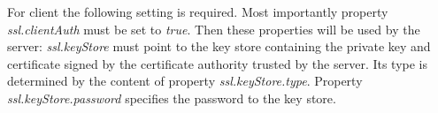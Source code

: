 For client the following setting is required. Most importantly property
\emph{ssl.clientAuth} must be set to \emph{true}. Then these properties will be
used by the server: \emph{ssl.keyStore} must point to the key store containing
the private key and certificate signed by the certificate authority trusted by
the server. Its type is determined by the content of property
\emph{ssl.keyStore.type}. Property \emph{ssl.keyStore.password} specifies
the password to the key store.
